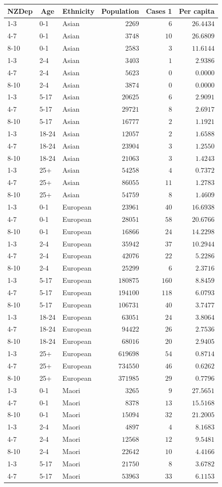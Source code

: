 \documentclass{article}
\begin{document}
\begin{table}[hbtp] \scriptsize
{}
\begin{center}
\begin{tabular}{lllrrr}
\hline\hline
\multicolumn{1}{c}{NZDep}&\multicolumn{1}{c}{Age}&\multicolumn{1}{c}{Ethnicity}&\multicolumn{1}{c}{Population}&\multicolumn{1}{c}{Cases 1}&\multicolumn{1}{c}{Per capita}\tabularnewline
\hline
1-3&0-1&Asian&$  2269$&$  6$&$26.4434$\tabularnewline
4-7&0-1&Asian&$  3748$&$ 10$&$26.6809$\tabularnewline
8-10&0-1&Asian&$  2583$&$  3$&$11.6144$\tabularnewline
1-3&2-4&Asian&$  3403$&$  1$&$ 2.9386$\tabularnewline
4-7&2-4&Asian&$  5623$&$  0$&$ 0.0000$\tabularnewline
8-10&2-4&Asian&$  3874$&$  0$&$ 0.0000$\tabularnewline
1-3&5-17&Asian&$ 20625$&$  6$&$ 2.9091$\tabularnewline
4-7&5-17&Asian&$ 29721$&$  8$&$ 2.6917$\tabularnewline
8-10&5-17&Asian&$ 16777$&$  2$&$ 1.1921$\tabularnewline
1-3&18-24&Asian&$ 12057$&$  2$&$ 1.6588$\tabularnewline
4-7&18-24&Asian&$ 23904$&$  3$&$ 1.2550$\tabularnewline
8-10&18-24&Asian&$ 21063$&$  3$&$ 1.4243$\tabularnewline
1-3&25+&Asian&$ 54258$&$  4$&$ 0.7372$\tabularnewline
4-7&25+&Asian&$ 86055$&$ 11$&$ 1.2783$\tabularnewline
8-10&25+&Asian&$ 54759$&$  8$&$ 1.4609$\tabularnewline
1-3&0-1&European&$ 23961$&$ 40$&$16.6938$\tabularnewline
4-7&0-1&European&$ 28051$&$ 58$&$20.6766$\tabularnewline
8-10&0-1&European&$ 16866$&$ 24$&$14.2298$\tabularnewline
1-3&2-4&European&$ 35942$&$ 37$&$10.2944$\tabularnewline
4-7&2-4&European&$ 42076$&$ 22$&$ 5.2286$\tabularnewline
8-10&2-4&European&$ 25299$&$  6$&$ 2.3716$\tabularnewline
1-3&5-17&European&$180875$&$160$&$ 8.8459$\tabularnewline
4-7&5-17&European&$194100$&$118$&$ 6.0793$\tabularnewline
8-10&5-17&European&$106731$&$ 40$&$ 3.7477$\tabularnewline
1-3&18-24&European&$ 63051$&$ 24$&$ 3.8064$\tabularnewline
4-7&18-24&European&$ 94422$&$ 26$&$ 2.7536$\tabularnewline
8-10&18-24&European&$ 68016$&$ 20$&$ 2.9405$\tabularnewline
1-3&25+&European&$619698$&$ 54$&$ 0.8714$\tabularnewline
4-7&25+&European&$734550$&$ 46$&$ 0.6262$\tabularnewline
8-10&25+&European&$371985$&$ 29$&$ 0.7796$\tabularnewline
1-3&0-1&Maori&$  3265$&$  9$&$27.5651$\tabularnewline
4-7&0-1&Maori&$  8378$&$ 13$&$15.5168$\tabularnewline
8-10&0-1&Maori&$ 15094$&$ 32$&$21.2005$\tabularnewline
1-3&2-4&Maori&$  4897$&$  4$&$ 8.1683$\tabularnewline
4-7&2-4&Maori&$ 12568$&$ 12$&$ 9.5481$\tabularnewline
8-10&2-4&Maori&$ 22642$&$ 10$&$ 4.4166$\tabularnewline
1-3&5-17&Maori&$ 21750$&$  8$&$ 3.6782$\tabularnewline
4-7&5-17&Maori&$ 53963$&$ 33$&$ 6.1153$\tabularnewline

\end{tabular}
\end{center}
\end{table}
\end{document}
